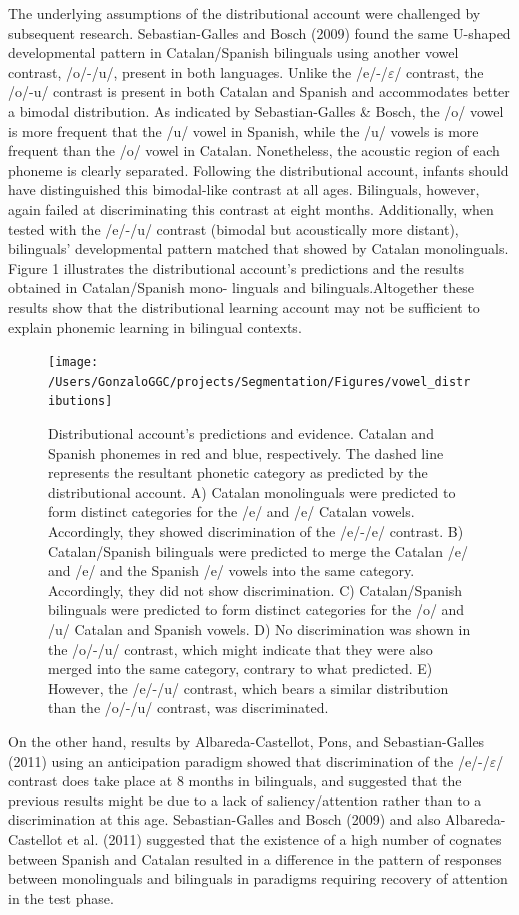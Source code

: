 \documentclass[man,floatsintext]{apa6}
\begin{document}
The underlying assumptions of the distributional account were challenged by subsequent research. Sebastian-Galles and Bosch (2009) found the same U-shaped developmental pattern in Catalan/Spanish bilinguals using another vowel contrast, /o/-/u/, present in both languages. Unlike the /e/-/\(\varepsilon\)/ contrast, the /o/-u/ contrast is present in both Catalan and Spanish and accommodates better a bimodal distribution. As indicated by Sebastian-Galles \& Bosch, the /o/ vowel is more frequent that the /u/ vowel in Spanish, while the /u/ vowels is more frequent than the /o/ vowel in Catalan. Nonetheless, the acoustic region of each phoneme is clearly separated. Following the distributional account, infants should have distinguished this bimodal-like contrast at all ages. Bilinguals, however, again failed at discriminating this contrast at eight months. Additionally, when tested with the /e/-/u/ contrast (bimodal but acoustically more distant), bilinguals' developmental pattern matched that showed by Catalan monolinguals. Figure 1 illustrates the distributional account's predictions and the results obtained in Catalan/Spanish mono- linguals and bilinguals.Altogether these results show that the distributional learning account may not be sufficient to explain phonemic learning in bilingual contexts.

\begin{figure}
\texttt{[image: /Users/GonzaloGGC/projects/Segmentation/Figures/vowel\_distributions]} \caption{Distributional account's predictions and evidence. Catalan and Spanish phonemes in red and blue, respectively. The dashed line represents the resultant phonetic category as predicted by the distributional account. A) Catalan monolinguals were predicted to form distinct categories for the /e/ and /e/ Catalan vowels. Accordingly, they showed discrimination of the /e/-/e/ contrast. B) Catalan/Spanish bilinguals were predicted to merge the Catalan /e/ and /e/ and the Spanish /e/ vowels into the same category. Accordingly, they did not show discrimination. C) Catalan/Spanish bilinguals were predicted to form distinct categories for the /o/ and /u/ Catalan and Spanish vowels. D) No discrimination was shown in the /o/-/u/ contrast, which might indicate that they were also merged into the same category, contrary to what predicted. E) However, the /e/-/u/ contrast, which bears a similar distribution than the /o/-/u/ contrast, was discriminated.}\label{fig:unnamed-chunk-1}
\end{figure}

On the other hand, results by Albareda-Castellot, Pons, and Sebastian-Galles (2011) using an anticipation paradigm showed that discrimination of the /e/-/\(\varepsilon\)/ contrast does take place at 8 months in bilinguals, and suggested that the previous results might be due to a lack of saliency/attention rather than to a discrimination at this age. Sebastian-Galles and Bosch (2009) and also Albareda-Castellot et al. (2011) suggested that the existence of a high number of cognates between Spanish and Catalan resulted in a difference in the pattern of responses between monolinguals and bilinguals in paradigms requiring recovery of attention in the test phase.
\end{document}
